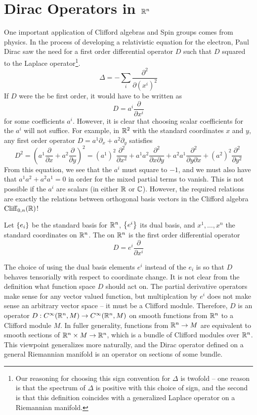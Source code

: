 %
\section{Dirac Operators in $\mathbb{R}^n$}
%
One important application of Clifford algebras and Spin groups comes from
physics. In the process of developing a relativistic equation for the electron,
Paul Dirac saw the need for a first order differential operator $D$ such
that $D$ squared to the Laplace operator\footnote{Our reasoning for choosing this sign
convention for $\Delta$ is twofold -- one reason is that the spectrum of $\Delta$
is positive with this choice of sign, and the second is that this definition
coincides with a generalized Laplace operator on a Riemannian manifold.}.
\[
\Delta = -\sum_i \frac{\partial^2}{\partial(x^i)^2}
\]
If $D$ were the be first order, it would have to be written as
\[
D = a^i \frac{\partial}{\partial x^i}
\]
for some coefficients $a^i$. However, it is clear that choosing scalar coefficients
for the $a^i$ will not suffice. For example, in $\mathbb{R}^2$ with the standard coordinates
$x$ and $y$, any first order operator $D = a^1\partial_x + a^2\partial_y$ satisfies
\[
D^2 = \left(a^1\frac{\partial}{\partial x} + a^2\frac{\partial}{\partial y}\right)^2
= (a^1)^2\frac{\partial^2}{\partial x^2} + a^1a^2\frac{\partial^2}{\partial x \partial y}
+ a^2a^1 \frac{\partial^2}{\partial y \partial x} + (a^2)^2 \frac{\partial^2}{\partial y^2}
\]
From this equation, we see that the $a^i$ must square to $-1$, and we must also
have that $a^1a^2 + a^2a^1 = 0$ in order for the mixed partial terms to vanish.
This is not possible if the $a^i$ are scalars (in either $\mathbb{R}$ or $\mathbb{C}$).
However, the required relations are exactly the relations between orthogonal
basis vectors in the Clifford algebra $\operatorname{Cliff}_{0,n}(\mathbb{R})$!
%
\begin{defn}
Let $\left\lbrace e_i \right\rbrace$ be the standard basis for $\mathbb{R}^n$, $\left\lbrace e^i \right\rbrace$ its dual basis, and
$x^1, \ldots ,x^n$ the standard coordinates on $\mathbb{R}^n$.
The  on $\mathbb{R}^n$ is the first order differential operator
\[
D = e^i\frac{\partial}{\partial x^i}
\]
\end{defn}
%
The choice of using the dual basis elements $e^i$ instead of the $e_i$ is
so that $D$ behaves tensorially with respect to coordinate change.
It is not clear from the definition what function space $D$ should act on.
The partial derivative operators make sense for any vector valued function, but
multiplcation by $e^i$ does not make sense an arbitrary vector space -- it must
be a Clifford module. Therefore, $D$ is an operator
$D: C^\infty(\mathbb{R}^n, M) \to C^\infty(\mathbb{R}^n, M)$ on smooth functions from $\mathbb{R}^n$
to a Clifford module $M$. In fuller generality, functions from $\mathbb{R}^n \to M$
are equivalent to smooth sections of $\mathbb{R}^n \times M \to \mathbb{R}^n$, which is a bundle
of Clifford modules over $\mathbb{R}^n$. This viewpoint generalizes more naturally,
and the Dirac operator defined on a general Riemannian manifold is an operator
on sections of some bundle. \\

